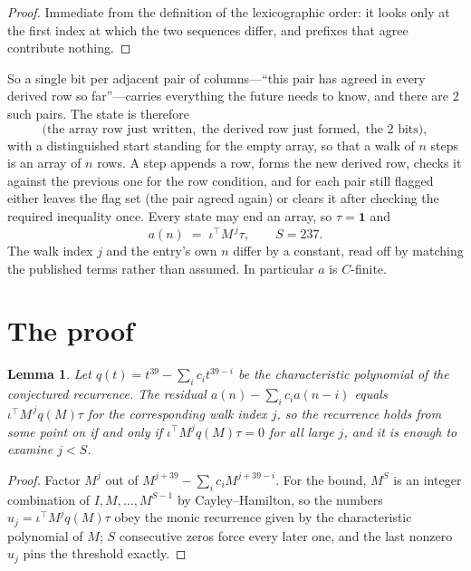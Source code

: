 \documentclass[11pt,a4paper]{article}
\theoremstyle{plain}
\newtheorem{lemma}[theorem]{Lemma}
\theoremstyle{definition}
\begin{document}
\begin{proof}
Immediate from the definition of the lexicographic order: it looks only at the first index at
which the two sequences differ, and prefixes that agree contribute nothing.
\end{proof}

So a single bit per adjacent pair of columns---``this pair has agreed in every derived row so
far''---carries everything the future needs to know, and there are $2$ such pairs. The state
is therefore
\[
\bigl(\text{the array row just written},\; \text{the derived row just formed},\;
\text{the 2 bits}\bigr),
\]
with a distinguished start standing for the empty array, so that a walk of $n$ steps is an array
of $n$ rows. A step appends a row, forms the new derived row, checks it against the previous one
for the row condition, and for each pair still flagged either leaves the flag set (the pair
agreed again) or clears it after checking the required inequality once. Every state may end an
array, so $\tau=\mathbf{1}$ and
\[
a(n)\;=\;\iota^{\!\top}M^{\,j}\tau ,\qquad S=237.
\]
The walk index $j$ and the entry's own $n$ differ by a constant, read off by matching the
published terms rather than assumed. In particular $a$ is $C$-finite.

\section{The proof}

\begin{lemma}\label{lem:crit}
Let $q(t)=t^{39}-\sum_i c_it^{39-i}$ be the characteristic polynomial of the
conjectured recurrence. The residual $a(n)-\sum_ic_ia(n-i)$ equals
$\iota^{\!\top}M^{\,j}q(M)\tau$ for the corresponding walk index $j$, so the recurrence
holds from some point on if and only if $\iota^{\!\top}M^{j}q(M)\tau=0$ for all large $j$,
and it is enough to examine $j<S$.
\end{lemma}

\begin{proof}
Factor $M^{j}$ out of $M^{j+39}-\sum_ic_iM^{j+39-i}$. For the bound, $M^{S}$
is an integer combination of $I,M,\dots,M^{S-1}$ by Cayley--Hamilton, so the numbers
$u_j=\iota^{\!\top}M^{j}q(M)\tau$ obey the monic recurrence given by the characteristic
polynomial of $M$; $S$ consecutive zeros force every later one, and the last nonzero $u_j$
pins the threshold exactly.
\end{proof}
\end{document}
